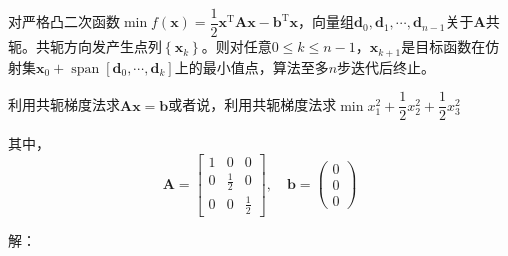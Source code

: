 \begin{theorem}[二次终止性]
    对严格凸二次函数$\min f(\boldsymbol{x}) = \dfrac{1}{2}\boldsymbol{x}^{\mathrm{T}}\boldsymbol{Ax}-\boldsymbol{b}^{\mathrm{T}}\boldsymbol{x}$，向量组$\boldsymbol{d}_0,\boldsymbol{d}_1,\cdots,\boldsymbol{d}_{n-1}$关于$\boldsymbol{A}$共轭。共轭方向发产生点列$\left\{ \boldsymbol{x}_{k} \right\}$。则对任意$0\leqslant k\leqslant n-1$，$\boldsymbol{x}_{k+1}$是目标函数在仿射集$\boldsymbol{x}_0+\operatorname{span}\left[ \boldsymbol{d}_0,\cdots,\boldsymbol{d}_{k} \right]$上的最小值点，算法至多$n$步迭代后终止。
\end{theorem}
\begin{example}
    利用共轭梯度法求$\boldsymbol{Ax} = \boldsymbol{b}$或者说，利用共轭梯度法求$\min x_1^2+\dfrac{1}{2}x_2^2+\dfrac{1}{2}x_3^2$\quad{}


    其中，
    \[
        \boldsymbol{A} = \begin{bmatrix}
            1 & 0 & 0\\
            0 & \frac{1}{2} & 0 \\
            0 & 0 & \frac{1}{2}
        \end{bmatrix},\quad
        \boldsymbol{b} = \begin{pmatrix}
            0\\0\\0
        \end{pmatrix}
    \]

    解：


\end{example}
